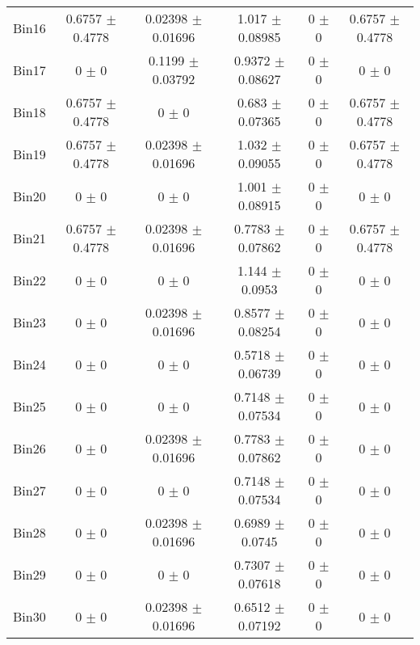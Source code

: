 \begin{tabular}{@{\extracolsep{4pt}}lccccc@{}}
     Bin16 & 0.6757 $\pm$ 0.4778 & 0.02398 $\pm$ 0.01696 & 1.017 $\pm$ 0.08985 & 0 $\pm$ 0 & 0.6757 $\pm$ 0.4778 \\ 
     Bin17 & 0 $\pm$ 0 & 0.1199 $\pm$ 0.03792 & 0.9372 $\pm$ 0.08627 & 0 $\pm$ 0 & 0 $\pm$ 0 \\ 
     Bin18 & 0.6757 $\pm$ 0.4778 & 0 $\pm$ 0 & 0.683 $\pm$ 0.07365 & 0 $\pm$ 0 & 0.6757 $\pm$ 0.4778 \\ 
     Bin19 & 0.6757 $\pm$ 0.4778 & 0.02398 $\pm$ 0.01696 & 1.032 $\pm$ 0.09055 & 0 $\pm$ 0 & 0.6757 $\pm$ 0.4778 \\ 
     Bin20 & 0 $\pm$ 0 & 0 $\pm$ 0 & 1.001 $\pm$ 0.08915 & 0 $\pm$ 0 & 0 $\pm$ 0 \\ 
     Bin21 & 0.6757 $\pm$ 0.4778 & 0.02398 $\pm$ 0.01696 & 0.7783 $\pm$ 0.07862 & 0 $\pm$ 0 & 0.6757 $\pm$ 0.4778 \\ 
     Bin22 & 0 $\pm$ 0 & 0 $\pm$ 0 & 1.144 $\pm$ 0.0953 & 0 $\pm$ 0 & 0 $\pm$ 0 \\ 
     Bin23 & 0 $\pm$ 0 & 0.02398 $\pm$ 0.01696 & 0.8577 $\pm$ 0.08254 & 0 $\pm$ 0 & 0 $\pm$ 0 \\ 
     Bin24 & 0 $\pm$ 0 & 0 $\pm$ 0 & 0.5718 $\pm$ 0.06739 & 0 $\pm$ 0 & 0 $\pm$ 0 \\ 
     Bin25 & 0 $\pm$ 0 & 0 $\pm$ 0 & 0.7148 $\pm$ 0.07534 & 0 $\pm$ 0 & 0 $\pm$ 0 \\ 
     Bin26 & 0 $\pm$ 0 & 0.02398 $\pm$ 0.01696 & 0.7783 $\pm$ 0.07862 & 0 $\pm$ 0 & 0 $\pm$ 0 \\ 
     Bin27 & 0 $\pm$ 0 & 0 $\pm$ 0 & 0.7148 $\pm$ 0.07534 & 0 $\pm$ 0 & 0 $\pm$ 0 \\ 
     Bin28 & 0 $\pm$ 0 & 0.02398 $\pm$ 0.01696 & 0.6989 $\pm$ 0.0745 & 0 $\pm$ 0 & 0 $\pm$ 0 \\ 
     Bin29 & 0 $\pm$ 0 & 0 $\pm$ 0 & 0.7307 $\pm$ 0.07618 & 0 $\pm$ 0 & 0 $\pm$ 0 \\ 
     Bin30 & 0 $\pm$ 0 & 0.02398 $\pm$ 0.01696 & 0.6512 $\pm$ 0.07192 & 0 $\pm$ 0 & 0 $\pm$ 0 \\ 
\hline\hline
  \end{tabular}
